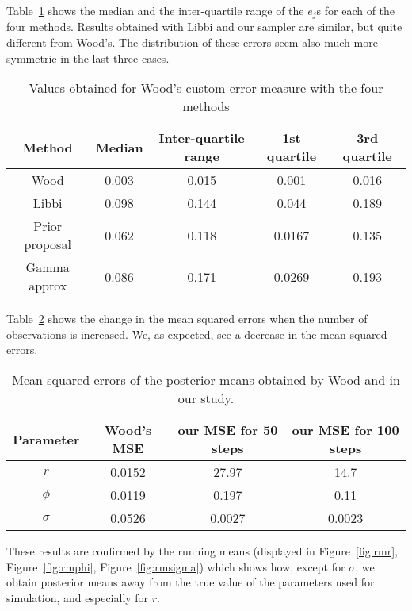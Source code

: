 \documentclass{article}
\begin{document}
Table~\ref{table:measure} shows the median and the inter-quartile range of the $e_j$s for each of the four methods. Results obtained with Libbi and our sampler are similar, but quite different from Wood's. The distribution of these errors seem also much more symmetric in the last three cases.

	\begin{table}[htb]
		\centering
		\begin{tabular}{c|c|c|c|c}
			Method & Median &  Inter-quartile range & 1st quartile & 3rd quartile \\ \hline
			Wood & 0.003 & 0.015 & 0.001 & 0.016\\ \hline
			Libbi & 0.098 & 0.144  & 0.044 & 0.189\\ \hline
			Prior proposal & 0.062 &  0.118 & 0.0167 & 0.135\\ \hline
			Gamma approx & 0.086 &  0.171 & 0.0269 & 0.193\\ \hline
		\end{tabular}
		\caption{Values obtained for Wood's custom error measure with the four methods}
		\label{table:measure}
	\end{table}


\clearpage
Table~\ref{table:mse} shows the change in the mean squared errors when the number of observations is increased. We, as expected, see a decrease in the mean squared errors.
	\begin{table}[htb]
		\centering
		\begin{tabular}{c|c|c|c}
			Parameter & Wood's MSE & our MSE for 50 steps & our MSE for 100 steps\\ \hline
			$r$ & 0.0152 & 27.97 & 14.7 \\ \hline
			$\phi$ & 0.0119 & 0.197 & 0.11\\ \hline
			$\sigma$ & 0.0526 &  0.0027 & 0.0023 \\ \hline
		\end{tabular}
		\caption{Mean squared errors of the posterior means obtained by Wood and in our study.}
		\label{table:mse}
		\vspace{0mm}
	\end{table}
	
These results are confirmed by the running means (displayed in Figure~\ref{fig:rmr}, Figure~\ref{fig:rmphi}, Figure~\ref{fig:rmsigma}) which shows how, except for $\sigma$, we obtain posterior means away from the true value of the parameters used for simulation, and especially for $r$.
\end{document}
